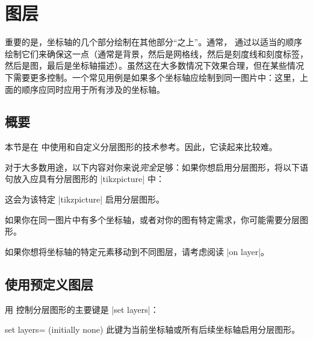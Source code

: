 
\section{图层}

{

重要的是，坐标轴的几个部分绘制在其他部分“之上”。通常，\PGFPlots{} 通过以适当的顺序绘制它们来确保这一点（通常是背景，然后是网格线，然后是刻度线和刻度标签，然后是图，最后是坐标轴描述）。虽然这在大多数情况下效果合理，但在某些情况下需要更多控制。一个常见用例是如果多个坐标轴应绘制到同一图片中：这里，上面的顺序应同时应用于所有涉及的坐标轴。


\subsection{概要}

本节是在 \PGFPlots{} 中使用和自定义分层图形的技术参考。因此，它读起来比较难。

对于大多数用途，以下内容对你来说\emph{完全}足够：如果你想启用分层图形，将以下语句放入应具有分层图形的 |tikzpicture| 中：

\begin{codeexample}
\end{codeexample}
\noindent 这会为该特定 |tikzpicture| 启用分层图形。

如果你在同一图片中有多个坐标轴，或者对你的图有特定需求，你可能需要分层图形。

如果你想将坐标轴的特定元素移动到不同图层，请考虑阅读 |on layer|。


\subsection{使用预定义图层}

用 \PGFPlots{} 控制分层图形的主要键是 |set layers|：


\begin{pgfplotskey}{set layers= (initially none)}
   此键为当前坐标轴或所有后续坐标轴启用分层图形。


\end{pgfplotskey}}
